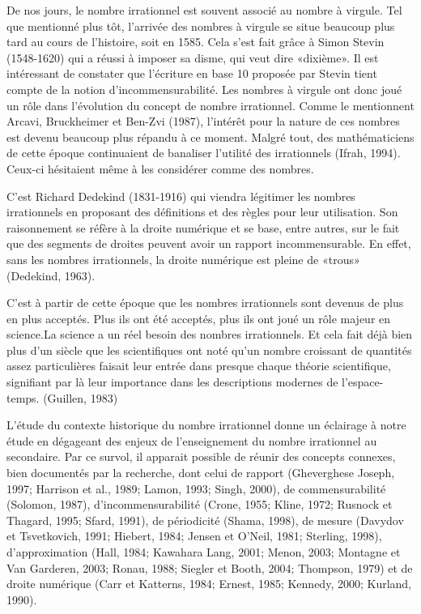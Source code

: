 De  nos  jours,  le  nombre  irrationnel  est  souvent  associé  au  nombre  à  virgule.  Tel  que  mentionné  plus  tôt,  l’arrivée  des  nombres  à  virgule  se  situe  beaucoup  plus  tard  au  cours  de  l’histoire,  soit  en  1585.  Cela  s’est  fait  grâce  à  Simon  Stevin  (1548-1620)  qui  a  réussi  à  imposer  sa  disme,  qui  veut  dire  «dixième».  Il  est  intéressant  de  constater  que  l’écriture  en  base 10 proposée par Stevin tient compte de la notion d’incommensurabilité. Les nombres à virgule ont donc joué un rôle dans l’évolution du concept de nombre irrationnel. Comme le mentionnent Arcavi, Bruckheimer et Ben-Zvi (1987), l’intérêt pour la nature de ces nombres est devenu beaucoup plus répandu à ce moment. Malgré tout, des mathématiciens de cette époque  continuaient  de  banaliser  l’utilité  des  irrationnels  (Ifrah,  1994).  Ceux-ci  hésitaient  même à les considérer comme des nombres.


C’est  Richard  Dedekind  (1831-1916)  qui  viendra  légitimer  les  nombres  irrationnels  en  proposant des définitions et des règles pour leur utilisation. Son raisonnement se réfère à la droite numérique et se base, entre autres, sur le fait que des segments de droites peuvent avoir un rapport incommensurable. En effet, sans les nombres irrationnels, la droite numérique est pleine de «trous» (Dedekind, 1963).

C’est à partir de cette époque que les nombres irrationnels sont devenus de plus en plus acceptés. Plus ils ont été acceptés, plus ils ont joué un rôle majeur en science.La science a un réel besoin des nombres irrationnels. Et cela fait déjà bien plus  d’un  siècle  que  les  scientifiques  ont  noté  qu’un  nombre  croissant  de quantités assez particulières faisait leur entrée dans presque chaque théorie scientifique, signifiant par là leur importance dans les descriptions modernes de l’espace-temps. (Guillen, 1983)

L’étude du contexte historique du nombre irrationnel donne un éclairage à notre étude en dégageant des enjeux de l’enseignement du nombre irrationnel au secondaire. Par ce survol, il apparait possible de réunir des concepts connexes, bien documentés par la recherche, dont celui de rapport (Gheverghese Joseph, 1997; Harrison et al., 1989; Lamon, 1993; Singh, 2000), de  commensurabilité  (Solomon,  1987),  d’incommensurabilité  (Crone,  1955;  Kline,  1972;  Rusnock et Thagard, 1995; Sfard, 1991), de périodicité (Shama, 1998), de mesure (Davydov et Tsvetkovich, 1991; Hiebert, 1984; Jensen et O’Neil, 1981; Sterling,  1998), d’approximation (Hall,  1984;  Kawahara  Lang,  2001;  Menon,  2003;  Montagne  et  Van  Garderen,  2003;  Ronau,  1988;  Siegler  et  Booth,  2004;  Thompson,  1979)  et  de  droite  numérique  (Carr  et  Katterns, 1984; Ernest, 1985; Kennedy, 2000; Kurland, 1990).


 